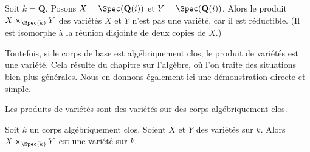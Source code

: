 \begin{example}
\label{example-product-not-a-variety}
Soit $k = \mathbf{Q}$. Posons $X = \Spec(\mathbf{Q}(i))$
et $Y = \Spec(\mathbf{Q}(i))$. Alors le produit
$X \times_{\Spec(k)} Y$ des variétés $X$ et $Y$
n'est pas une variété, car il est réductible. (Il est
isomorphe à la réunion disjointe de deux copies de $X$.)
\end{example}

\noindent
Toutefois, si le corps de base est algébriquement clos, le produit de
variétés est une variété. Cela résulte du chapitre sur l'algèbre, où
l'on traite des situations bien plus générales. Nous en donnons également
ici une démonstration directe et simple.

\begin{lemma}
\label{lemma-product-varieties}
\begin{slogan}
Les produits de variétés sont des variétés sur des corps algébriquement clos.
\end{slogan}
Soit $k$ un corps algébriquement clos.
Soient $X$ et $Y$ des variétés sur $k$.
Alors $X \times_{\Spec(k)} Y$ est une variété sur $k$.
\end{lemma}

